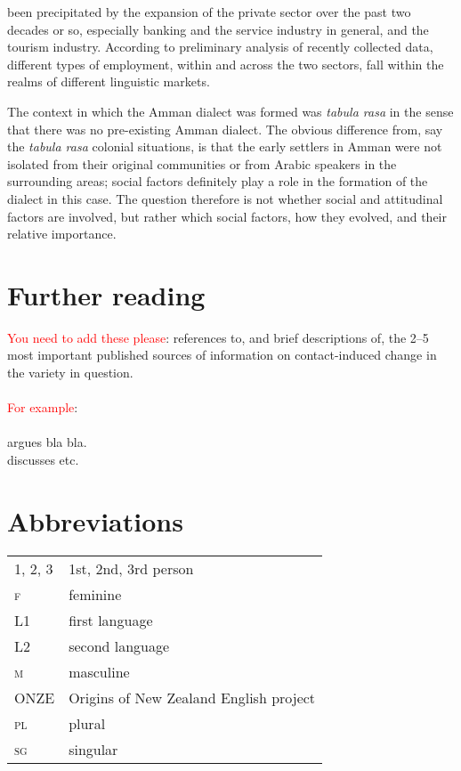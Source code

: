\documentclass[output=paper]{langsci/langscibook}
\begin{document}
been precipitated by the expansion of the private sector over the past two decades or so, especially banking and the service industry in general, and the tourism industry. According to preliminary analysis of recently collected data, different types of employment, within and across the two sectors, fall within the realms of different linguistic markets.

The context in which the Amman dialect was formed was \textit{tabula rasa} in the sense that there was no pre-existing Amman dialect. The obvious difference from, say the \textit{tabula rasa} colonial situations, is that the early settlers in Amman were not isolated from their original communities or from Arabic speakers in the surrounding areas; social factors definitely play a role in the formation of the dialect in this case. The question therefore is not whether social and attitudinal factors are involved, but rather which social factors, how they evolved, and their relative importance.

\section*{Further reading}

\textcolor{red}{You need to add these please}: references to, and brief descriptions of, the 2–5 most important published sources of information on contact-induced change in the variety in question.\\
\\
\textcolor{red}{For example}:\\
\\
\citet{Labov1994} argues bla bla.\\
\citet{Al-Wer2014} discusses etc.


\section*{Abbreviations}

\begin{tabularx}{.5\textwidth}{@{}lQ@{}}
\textsc{1, 2, 3} & 1st, 2nd, 3rd person \\
\textsc{f}  &  feminine\\
L1 & first language \\
L2 & second language \\
\textsc{m}  &  masculine\\
ONZE & Origins of New Zealand English project \\
\textsc{pl}  &  plural\\
\textsc{sg}  &  singular\\
\end{tabularx}%


{\sloppy\printbibliography[heading=subbibliography,notkeyword=this]}
\end{document}
